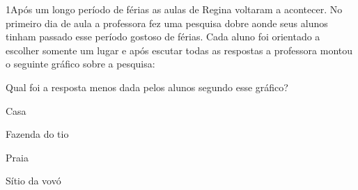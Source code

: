 

\num{1}Após um longo período de férias as aulas de Regina voltaram a
acontecer. No primeiro dia de aula a professora fez uma pesquisa dobre
aonde seus alunos tinham passado esse período gostoso de férias. Cada
aluno foi orientado a escolher somente um lugar e após escutar todas as
respostas a professora montou o seguinte gráfico sobre a pesquisa:


Qual foi a resposta menos dada pelos alunos segundo esse gráfico?

\begin{escolha}
\item
  Casa
\item
  Fazenda do tio
\item
  Praia
\item
  Sítio da vovó
\end{escolha}

